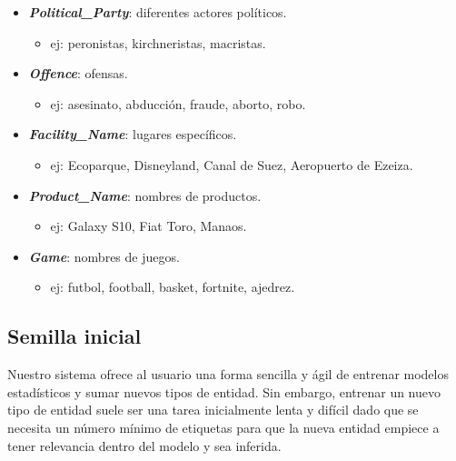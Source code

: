 \documentclass[12pt,a4paper,]{scrartcl}
\providecommand{\tightlist}{%
  \setlength{\itemsep}{0pt}\setlength{\parskip}{0pt}}
\begin{document}
\begin{itemize}
\tightlist
\item
  \textbf{\emph{Political\_Party}}: diferentes actores políticos.

  \begin{itemize}
  \tightlist
  \item
    ej: peronistas, kirchneristas, macristas.
  \end{itemize}
\item
  \textbf{\emph{Offence}}: ofensas.

  \begin{itemize}
  \tightlist
  \item
    ej: asesinato, abducción, fraude, aborto, robo.
  \end{itemize}
\item
  \textbf{\emph{Facility\_Name}}: lugares específicos.

  \begin{itemize}
  \tightlist
  \item
    ej: Ecoparque, Disneyland, Canal de Suez, Aeropuerto de Ezeiza.
  \end{itemize}
\item
  \textbf{\emph{Product\_Name}}: nombres de productos.

  \begin{itemize}
  \tightlist
  \item
    ej: Galaxy S10, Fiat Toro, Manaos.
  \end{itemize}
\item
  \textbf{\emph{Game}}: nombres de juegos.

  \begin{itemize}
  \tightlist
  \item
    ej: futbol, football, basket, fortnite, ajedrez.
  \end{itemize}
\end{itemize}

\hypertarget{semilla-inicial}{%
\subsection{Semilla inicial}\label{semilla-inicial}}

Nuestro sistema ofrece al usuario una forma sencilla y ágil de entrenar modelos estadísticos y sumar nuevos tipos de entidad. Sin embargo, entrenar un nuevo tipo de entidad suele ser una tarea inicialmente lenta y difícil dado que se necesita un número mínimo de etiquetas para que la nueva entidad empiece a tener relevancia dentro del modelo y sea inferida.
\end{document}
